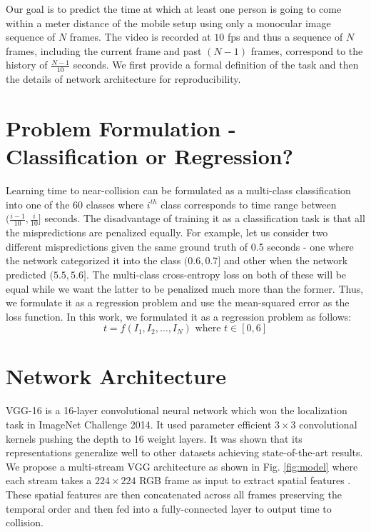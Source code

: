 Our goal is to predict the time at which at least one person is going to come within a meter distance of the mobile setup using only a monocular image sequence of $N$ frames. The video is recorded at $10$ fps and thus a sequence of $N$ frames, including the current frame and past $(N-1)$ frames, correspond to the history of $\frac{N-1}{10}$ seconds. We first provide a formal definition of the task and then the details of network architecture for reproducibility.   

\section{Problem Formulation - Classification or Regression?}

Learning time to near-collision can be formulated as a multi-class classification into one of the 60 classes where $i^{th}$ class corresponds to time range between $(\frac{i-1}{10}, \frac{i}{10}]$ seconds. The disadvantage of training it as a classification task is that all the mispredictions are penalized equally. For example, let us consider two different mispredictions given the same ground truth of 0.5 seconds - one where the network categorized it into the class $(0.6, 0.7]$ and other when the network predicted $(5.5, 5.6]$. The multi-class cross-entropy loss on both of these will be equal while we want the latter to be penalized much more than the former. Thus, we formulate it as a regression problem and use the mean-squared error as the loss function. In this work, we formulated it as a regression problem as follows:
$$
t = f(I_{1}, I_{2}, \hdots, I_{N}) \text{ where } t \in [0,6]
$$

\section{Network Architecture}
VGG-16 \cite{vgg} is a 16-layer convolutional neural network which won the localization task in ImageNet Challenge 2014. It used parameter efficient $3 \times 3$ convolutional kernels pushing the depth to 16 weight layers. It was shown that its representations generalize well to other datasets achieving state-of-the-art results. We propose a multi-stream VGG architecture as shown in Fig. \ref{fig:model} where each stream takes a $224 \times 224$ RGB frame as input to extract spatial features . These spatial features are then concatenated across all frames preserving the temporal order and then fed into a fully-connected layer to output time to collision. \\

